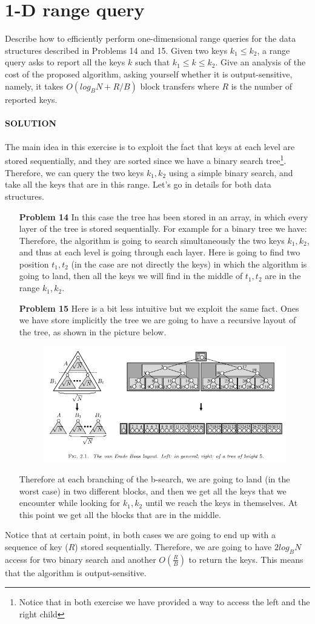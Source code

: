\documentclass[a4paper]{article}
\begin{document}
\section*{1-D range query}
Describe how to efficiently perform one-dimensional range queries
for the data structures described in Problems 14 and 15. Given two keys $k_1 \leq k_2$, a
range query asks to report all the keys $k$ such that $k_1 \leq k \leq k_2$. Give an analysis of the
cost of the proposed algorithm, asking yourself whether it is output-sensitive, namely,
it takes $O(log_B N + R/B)$ block transfers where $R$ is the number of reported keys.
\\
\\
\textbf{SOLUTION}
\\
\\
The main idea in this exercise is to exploit the fact that keys at each level are stored sequentially, and they are sorted since we have a binary search tree\footnote{Notice that in both exercise we have provided a way to access the left and the right child}. Therefore, we can query the two keys $k_1,k_2$ using a simple binary search, and take all the keys that are in this range. Let's go in details for both data structures.
\begin{itemize}
\item[\textbf{Problem 14}] In this case the tree has been stored in an array, in which every layer of the tree is stored sequentially. For example for a binary tree we have: 
\begin{equation}
[root,L_0,R_1,L_{00},R_{01},L_{10},R_{11},...] \nonumber
\end{equation}
Therefore, the algorithm is going to search simultaneously the two keys $k_1,k_2$, and thus at each level is going through each layer. Here is going to find two position $t_1,t_2$ (in the case are not directly the keys) in which the algorithm is going to land, then all the keys we will find in the middle of $t_1,t_2$ are in the range $k_1,k_2$. 
\item[\textbf{Problem 15}] Here is a bit less intuitive but we exploit the same fact. Ones we have store implicitly the tree we are going to have a recursive layout of the tree, as shown in the picture below.
\begin{figure}[H]
\centering
\includegraphics[scale=0.35]{VDB.png}
\end{figure}
Therefore at each branching of the b-search, we are going to land (in the worst case) in two different blocks, and then we get all the keys that we encounter while looking for  $k_1,k_2$ until we reach the keys in themselves. At this point we get all the blocks that are in the middle. 
\end{itemize}
Notice that at certain point, in both cases we are going to end up with a sequence of key ($R$) stored sequentially. Therefore, we are going to have $2 log_B N$ access for two binary search and another $O(\frac{R}{B})$ to return the keys. This means that the algorithm is output-sensitive.
\end{document}
